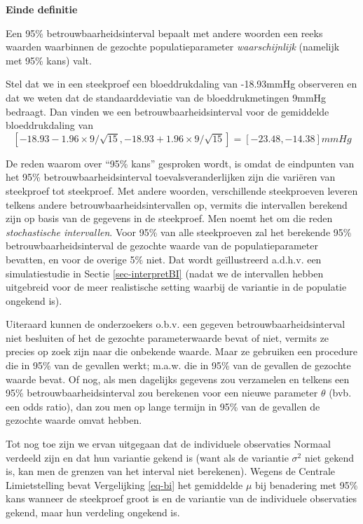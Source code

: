 \documentclass[
  dutch,
  letterpaper,
  12pt]{book}
\theoremstyle{definition}
\theoremstyle{definition}
\theoremstyle{definition}
\theoremstyle{remark}
\begin{document}
\textbf{Einde definitie}

Een 95\% betrouwbaarheidsinterval bepaalt met andere woorden een reeks
waarden waarbinnen de gezochte populatieparameter \emph{waarschijnlijk}
(namelijk met 95\% kans) valt.

Stel dat we in een steekproef een bloeddrukdaling van -18.93mmHg
observeren en dat we weten dat de standaarddeviatie van de
bloeddrukmetingen 9mmHg bedraagt. Dan vinden we een
betrouwbaarheidsinterval voor de gemiddelde bloeddrukdaling van
\[\left[-18.93-1.96\times 9/\sqrt{15},-18.93+1.96\times 9/\sqrt{15}\right]=[-23.48,-14.38]mmHg\]

De reden waarom over ``95\% kans'' gesproken wordt, is omdat de
eindpunten van het 95\% betrouwbaarheidsinterval toevalsveranderlijken
zijn die variëren van steekproef tot steekproef. Met andere woorden,
verschillende steekproeven leveren telkens andere
betrouwbaarheidsintervallen op, vermits die intervallen berekend zijn op
basis van de gegevens in de steekproef. Men noemt het om die reden
\emph{stochastische intervallen}. Voor 95\% van alle steekproeven zal
het berekende 95\% betrouwbaarheidsinterval de gezochte waarde van de
populatieparameter bevatten, en voor de overige 5\% niet. Dat wordt
geïllustreerd a.d.h.v. een simulatiestudie in Sectie
\ref{sec-interpretBI} (nadat we de intervallen hebben uitgebreid voor de
meer realistische setting waarbij de variantie in de populatie ongekend
is).

Uiteraard kunnen de onderzoekers o.b.v. een gegeven
betrouwbaarheidsinterval niet besluiten of het de gezochte
parameterwaarde bevat of niet, vermits ze precies op zoek zijn naar die
onbekende waarde. Maar ze gebruiken een procedure die in 95\% van de
gevallen werkt; m.a.w. die in 95\% van de gevallen de gezochte waarde
bevat. Of nog, als men dagelijks gegevens zou verzamelen en telkens een
95\% betrouwbaarheidsinterval zou berekenen voor een nieuwe parameter
\(\theta\) (bvb. een odds ratio), dan zou men op lange termijn in 95\%
van de gevallen de gezochte waarde omvat hebben.

Tot nog toe zijn we ervan uitgegaan dat de individuele observaties
Normaal verdeeld zijn en dat hun variantie gekend is (want als de
variantie \(\sigma^2\) niet gekend is, kan men de grenzen van het
interval niet berekenen). Wegens de Centrale Limietstelling bevat
Vergelijking \ref{eq-bi} het gemiddelde \(\mu\) bij benadering met 95\%
kans wanneer de steekproef groot is en de variantie van de individuele
observaties gekend, maar hun verdeling ongekend is.
\end{document}
